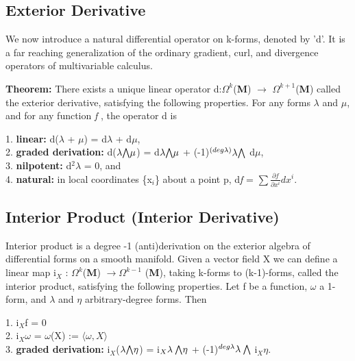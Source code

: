 \subsection{Exterior Derivative}
We now introduce a natural differential operator on k-forms, denoted by 'd'. 
It is a far reaching generalization of the ordinary gradient, curl, and divergence operators of multivariable calculus.

\textbf{Theorem: } There exists a unique linear operator d:$\Omega^k$(\textbf{M}) $\rightarrow$ $\Omega^{k+1}$(\textbf{M}) called the exterior derivative, satisfying the following properties. 
For any forms $\lambda$ and $\mu$, and for any function \textit{f} , the operator d is

1. \textbf{linear:} d($\lambda$ + $\mu$) = d$\lambda$ + d$\mu$,\\
2. \textbf{graded derivation:} d($\lambda \exterior \mu$) = d$\lambda \exterior \mu$ + (-1)$^{(deg \lambda)} \lambda \exterior$ d$\mu$,\\
3. \textbf{nilpotent:} d$^2 \lambda$ = 0, and \\
4. \textbf{natural:} in local coordinates \{x$_i$\} about a point p, d\textit{f} = $\sum \frac{\partial \textit{f}}{\partial x^i} dx^i$.

\subsection{Interior Product (Interior Derivative)}
Interior product is a degree -1 (anti)derivation on the exterior algebra of differential forms on a smooth manifold.
Given a vector field X we can define a linear map i$_X$ : $\Omega^k$(\textbf{M}) $\rightarrow \Omega^{k-1}$ (\textbf{M}), taking
k-forms to (k-1)-forms, called the interior product, satisfying the following
properties. Let f be a function, $\omega$ a 1-form, and $\lambda$ and $\eta$ arbitrary-degree forms. Then

1. i$_X$f = 0 \\
2. i$_X \omega$ = $\omega$(X) := $\langle \omega, X \rangle$ \\
3. \textbf{graded derivation:} i$_X$($\lambda \exterior \eta$) = i$_X \lambda \: \exterior \eta$ + (-1)$^{deg \lambda} \lambda \: \exterior$ i$_X \eta$.

\newpage
